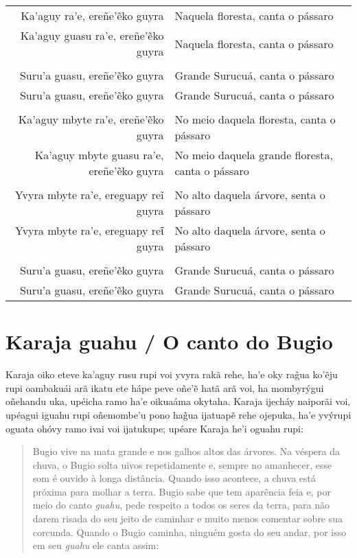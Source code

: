 \begin{itemize}
\begin{table}[]
\begin{tabular}{rl}
Ka'aguy ra'e, ereñe'ẽko guyra          & Naquela floresta, canta o pássaro           \\
Ka'aguy guasu ra'e, ereñe'ẽko guyra          & Naquela floresta, canta o pássaro           \\
                  &                     \\
Suru'a guasu, ereñe'ẽko guyra          & Grande Surucuá, canta o pássaro           \\
Suru'a guasu, ereñe'ẽko guyra          & Grande Surucuá, canta o pássaro           \\
                  &                     \\
Ka'aguy mbyte ra'e, ereñe'ẽko guyra  & No meio daquela floresta, canta o pássaro           \\
Ka'aguy mbyte guasu ra'e, ereñe'ẽko guyra & No meio daquela grande floresta, canta o pássaro           \\
                  &                     \\
Yvyra mbyte ra'e, ereguapy reĩ guyra   & No alto daquela árvore, senta o pássaro           \\
Yvyra mbyte ra'e, ereguapy reῖ guyra   & No alto daquela árvore, senta o pássaro           \\
                  &                     \\
Suru'a guasu, ereñe'ẽko guyra          & Grande Surucuá, canta o pássaro           \\
Suru'a guasu, ereñe'ẽko guyra          & Grande Surucuá, canta o pássaro           \\
\end{tabular}
\end{table}

\chapter{Karaja guahu / O canto do Bugio}

Karaja oiko eteve ka'aguy rusu rupi voi yvyra rakã rehe, ha'e oky rag̃ua
ko'ẽju rupi oambakuái arã ikatu ete hápe peve oñe'ẽ hatã arã voi, ha
mombyrýgui oñehandu uka, upéicha ramo ha'e oikuaáma okytaha. Karaja
ijecháy naiporãi voi, upéagui iguahu rupi oñemombe'u pono hag̃ua ijatuapẽ
rehe ojepuka, ha'e yvýrupi oguata ohóvy ramo ivai voi ijatukupe; upéare
Karaja he'i oguahu rupi:

\begin{quote}
Bugio vive na mata grande e nos galhos altos das árvores. Na véspera da
chuva, o Bugio solta uivos repetidamente e, sempre no amanhecer, esse
som é ouvido à longa distância. Quando isso acontece, a chuva está
próxima para molhar a terra. Bugio sabe que tem aparência feia e, por
meio do canto \emph{guahu}, pede respeito a todos os seres da terra,
para não darem risada do seu jeito de caminhar e muito menos comentar
sobre sua corcunda. Quando o Bugio caminha, ninguém gosta do seu andar,
por isso em seu \emph{guahu} ele canta assim:
\end{quote}




\end{itemize}
